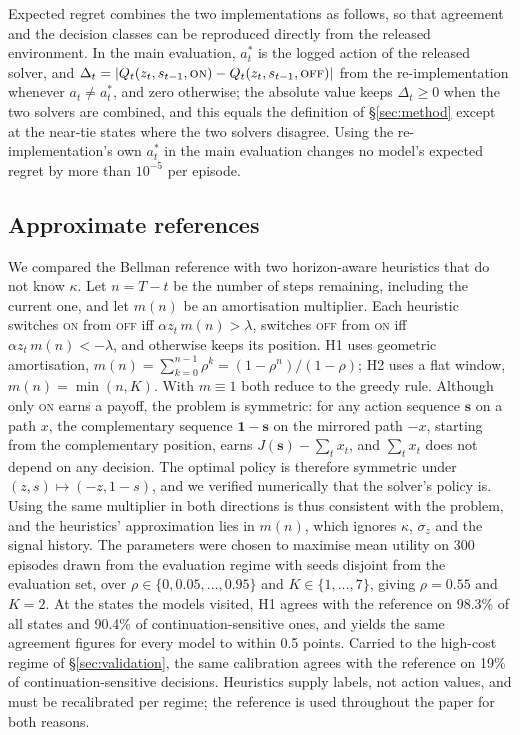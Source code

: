 \documentclass[10pt,a4paper,twocolumn]{article}
\newcommand{\J}{J}
\newcommand{\ON}{\textsc{on}}
\newcommand{\OFF}{\textsc{off}}
\newcommand{\sigz}{\sigma_z}
\begin{document}
Expected regret combines the two implementations as follows, so that agreement and the decision classes can be reproduced directly from the released environment. In the main evaluation, $a^*_t$ is the logged action of the released solver, and $\Delta_t=|Q_t(z_t,s_{t-1},\ON)-Q_t(z_t,s_{t-1},\OFF)|$ from the re-implementation whenever $a_t\neq a^*_t$, and zero otherwise; the absolute value keeps $\Delta_t\ge0$ when the two solvers are combined, and this equals the definition of \S\ref{sec:method} except at the near-tie states where the two solvers disagree. Using the re-implementation's own $a^*_t$ in the main evaluation changes no model's expected regret by more than $10^{-5}$ per episode.

\subsection{Approximate references}\label{app:verify-heur}
We compared the Bellman reference with two horizon-aware heuristics that do not know $\kappa$. Let $n=T-t$ be the number of steps remaining, including the current one, and let $m(n)$ be an amortisation multiplier. Each heuristic switches \ON{} from \OFF{} iff $\alpha z_t\,m(n)>\lambda$, switches \OFF{} from \ON{} iff $\alpha z_t\,m(n)<-\lambda$, and otherwise keeps its position. H1 uses geometric amortisation, $m(n)=\sum_{k=0}^{n-1}\rho^k=(1-\rho^n)/(1-\rho)$; H2 uses a flat window, $m(n)=\min(n,K)$. With $m\equiv1$ both reduce to the greedy rule. Although only \ON{} earns a payoff, the problem is symmetric: for any action sequence $\mathbf s$ on a path $x$, the complementary sequence $\mathbf 1-\mathbf s$ on the mirrored path $-x$, starting from the complementary position, earns $\J(\mathbf s)-\sum_t x_t$, and $\sum_t x_t$ does not depend on any decision. The optimal policy is therefore symmetric under $(z,s)\mapsto(-z,1-s)$, and we verified numerically that the solver's policy is. Using the same multiplier in both directions is thus consistent with the problem, and the heuristics' approximation lies in $m(n)$, which ignores $\kappa$, $\sigz$ and the signal history. The parameters were chosen to maximise mean utility on 300 episodes drawn from the evaluation regime with seeds disjoint from the evaluation set, over $\rho\in\{0,0.05,\dots,0.95\}$ and $K\in\{1,\dots,7\}$, giving $\rho{=}0.55$ and $K{=}2$. At the states the models visited, H1 agrees with the reference on 98.3\% of all states and 90.4\% of continuation-sensitive ones, and yields the same agreement figures for every model to within 0.5 points. Carried to the high-cost regime of \S\ref{sec:validation}, the same calibration agrees with the reference on 19\% of continuation-sensitive decisions. Heuristics supply labels, not action values, and must be recalibrated per regime; the reference is used throughout the paper for both reasons.
\end{document}
